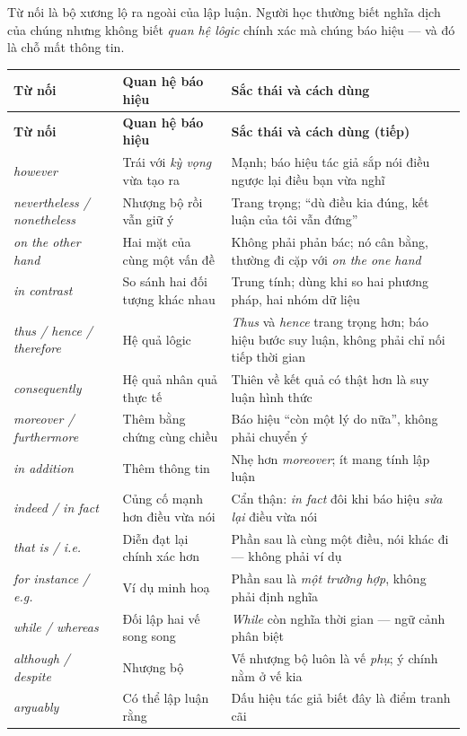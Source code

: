 \documentclass[../../english.tex]{subfiles}
\begin{document}
Từ nối là bộ xương lộ ra ngoài của lập luận. Người học thường biết nghĩa dịch của chúng nhưng không biết \emph{quan hệ lôgic} chính xác mà chúng báo hiệu --- và đó là chỗ mất thông tin.

\begin{center}\footnotesize
{}
\begin{longtable}{@{}L{3.4cm}L{4.4cm}L{6.4cm}@{}}
\toprule
\textbf{Từ nối} & \textbf{Quan hệ báo hiệu} & \textbf{Sắc thái và cách dùng}\\
\midrule
\endfirsthead
\toprule
\textbf{Từ nối} & \textbf{Quan hệ báo hiệu} & \textbf{Sắc thái và cách dùng (tiếp)}\\
\midrule
\endhead
\emph{however} & Trái với \emph{kỳ vọng} vừa tạo ra & Mạnh; báo hiệu tác giả sắp nói điều ngược lại điều bạn vừa nghĩ\\
\emph{nevertheless / nonetheless} & Nhượng bộ rồi vẫn giữ ý & Trang trọng; ``dù điều kia đúng, kết luận của tôi vẫn đứng''\\
\emph{on the other hand} & Hai mặt của cùng một vấn đề & Không phải phản bác; nó cân bằng, thường đi cặp với \emph{on the one hand}\\
\emph{in contrast} & So sánh hai đối tượng khác nhau & Trung tính; dùng khi so hai phương pháp, hai nhóm dữ liệu\\
\emph{thus / hence / therefore} & Hệ quả lôgic & \emph{Thus} và \emph{hence} trang trọng hơn; báo hiệu bước suy luận, không phải chỉ nối tiếp thời gian\\
\emph{consequently} & Hệ quả nhân quả thực tế & Thiên về kết quả có thật hơn là suy luận hình thức\\
\emph{moreover / furthermore} & Thêm bằng chứng cùng chiều & Báo hiệu ``còn một lý do nữa'', không phải chuyển ý\\
\emph{in addition} & Thêm thông tin & Nhẹ hơn \emph{moreover}; ít mang tính lập luận\\
\emph{indeed / in fact} & Củng cố mạnh hơn điều vừa nói & Cẩn thận: \emph{in fact} đôi khi báo hiệu \emph{sửa lại} điều vừa nói\\
\emph{that is / i.e.} & Diễn đạt lại chính xác hơn & Phần sau là cùng một điều, nói khác đi --- không phải ví dụ\\
\emph{for instance / e.g.} & Ví dụ minh hoạ & Phần sau là \emph{một trường hợp}, không phải định nghĩa\\
\emph{while / whereas} & Đối lập hai vế song song & \emph{While} còn nghĩa thời gian --- ngữ cảnh phân biệt\\
\emph{although / despite} & Nhượng bộ & Vế nhượng bộ luôn là vế \emph{phụ}; ý chính nằm ở vế kia\\
\emph{arguably} & Có thể lập luận rằng & Dấu hiệu tác giả biết đây là điểm tranh cãi\\
\bottomrule
\end{longtable}
\end{center}
\end{document}
